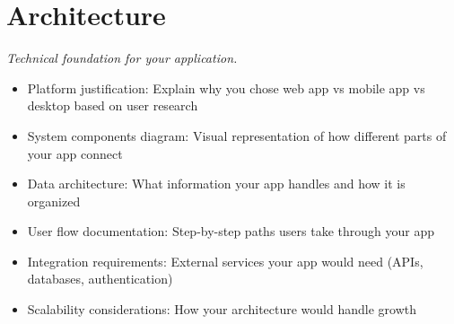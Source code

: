 \section{Architecture}
\emph{Technical foundation for your application.}

\begin{itemize}
    \item Platform justification: Explain why you chose web app vs mobile app vs desktop based on user research
    \item System components diagram: Visual representation of how different parts of your app connect
    \item Data architecture: What information your app handles and how it is organized
    \item User flow documentation: Step-by-step paths users take through your app
    \item Integration requirements: External services your app would need (APIs, databases, authentication)
    \item Scalability considerations: How your architecture would handle growth
\end{itemize}